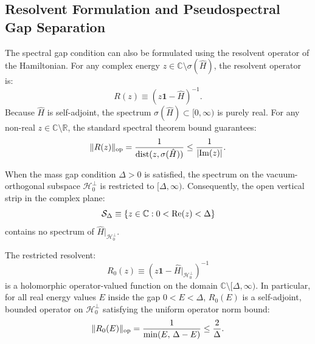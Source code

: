 \subsection{Resolvent Formulation and Pseudospectral Gap Separation}
\label{subsec:resolvent_formulation}

The spectral gap condition can also be formulated using the resolvent operator of the Hamiltonian. For any complex energy $z \in \mathbb{C} \setminus \sigma(\hat{H})$, the resolvent operator is:
\begin{equation}
\label{eq:resolvent_def}
R(z) \equiv (z \mathbf{1} - \hat{H})^{-1}.
\end{equation}
Because $\hat{H}$ is self-adjoint, the spectrum $\sigma(\hat{H}) \subset [0, \infty)$ is purely real. For any non-real $z \in \mathbb{C} \setminus \mathbb{R}$, the standard spectral theorem bound guarantees:
\begin{equation}
\label{eq:standard_resolvent_bound}
\|R(z)\|_{\mathrm{op}} = \frac{1}{\mathrm{dist}(z, \sigma(\hat{H}))} \le \frac{1}{|\mathrm{Im}(z)|}.
\end{equation}

When the mass gap condition $\Delta > 0$ is satisfied, the spectrum on the vacuum-orthogonal subspace $\mathcal{H}_0^\perp$ is restricted to $[ \Delta, \infty)$. Consequently, the open vertical strip in the complex plane:
\begin{equation}
\label{eq:spectral_strip_def}
\mathcal{S}_\Delta \equiv \left\{ z \in \mathbb{C} : 0 < \mathrm{Re}(z) < \Delta \right\}
\end{equation}
contains no spectrum of $\hat{H}|_{\mathcal{H}_0^\perp}$. 

\begin{proposition}
\label{prop:resolvent_analytic_continuation}
The restricted resolvent:
\begin{equation}
R_0(z) \equiv (z \mathbf{1} - \hat{H}|_{\mathcal{H}_0^\perp})^{-1}
\end{equation}
is a holomorphic operator-valued function on the domain $\mathbb{C} \setminus [\Delta, \infty)$. In particular, for all real energy values $E$ inside the gap $0 < E < \Delta$, $R_0(E)$ is a self-adjoint, bounded operator on $\mathcal{H}_0^\perp$ satisfying the uniform operator norm bound:
\begin{equation}
\label{eq:resolvent_in_gap_bound}
\|R_0(E)\|_{\mathrm{op}} = \frac{1}{\min(E, \, \Delta - E)} \le \frac{2}{\Delta}.
\end{equation}
\end{proposition}

